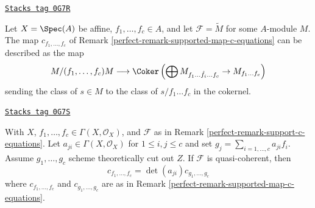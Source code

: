 \begin{example}
\label{perfect-example-affine-supported-map-c-equations}
\href{https://stacks.math.columbia.edu/tag/0G7R}{\texttt{Stacks tag 0G7R}}

Let $X = \Spec(A)$ be affine, $f_1, \ldots, f_c \in A$, and let
$\mathcal{F} = \widetilde{M}$ for some $A$-module $M$. The map
$c_{f_1, \ldots, f_c}$ of Remark \ref{perfect-remark-supported-map-c-equations}
can be described as the map
$$
M/(f_1, \ldots, f_c)M
\longrightarrow
\Coker\left(
\bigoplus M_{f_1 \ldots \hat f_i \ldots f_c} \to M_{f_1 \ldots f_c}
\right)
$$
sending the class of $s \in M$ to the class of $s/f_1 \ldots f_c$
in the cokernel.
\end{example}

\begin{lemma}
\label{perfect-lemma-supported-map-determinant}
\href{https://stacks.math.columbia.edu/tag/0G7S}{\texttt{Stacks tag 0G7S}}

With $X$, $f_1, \ldots, f_c \in \Gamma(X, \mathcal{O}_X)$, and
$\mathcal{F}$ as in Remark \ref{perfect-remark-support-c-equations}.
Let $a_{ji} \in \Gamma(X, \mathcal{O}_X)$ for $1 \leq i, j \leq c$
and set $g_j = \sum_{i = 1, \ldots, c} a_{ji}f_i$. Assume $g_1, \ldots, g_c$
scheme theoretically cut out $Z$. If $\mathcal{F}$ is quasi-coherent, then
$$
c_{f_1, \ldots, f_c} = \det(a_{ji}) c_{g_1, \ldots, g_c}
$$
where $c_{f_1, \ldots, f_c}$ and $c_{g_1, \ldots, g_c}$ are as in
Remark \ref{perfect-remark-supported-map-c-equations}.
\end{lemma}

